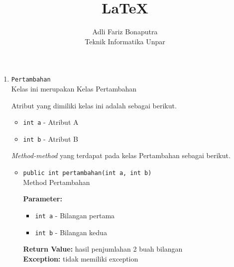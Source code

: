 \documentclass{article}
\title{\LaTeX}
\author{Adli Fariz Bonaputra \\ Teknik Informatika Unpar}
\begin{document}
\maketitle

\begin{enumerate}
	\item \texttt{Pertambahan}\\
	{Kelas ini merupakan Kelas Pertambahan}
	
	Atribut yang dimiliki kelas ini adalah sebagai berikut.
	\begin{itemize}
		\item \texttt{int a} -
		{Atribut A}
		\item \texttt{int b} -
		{Atribut B}
	\end{itemize}
	
	{\it Method-method} yang terdapat pada kelas Pertambahan sebagai berikut.
	\begin{itemize}
		\item \texttt{public int pertambahan(int a, int b)}\\
		{Method Pertambahan}
		
		\textbf{Parameter:}
		\begin{itemize}
			\item \texttt{int a} - 
			{Bilangan pertama}
			\item \texttt{int b} - 
			{Bilangan kedua}
		\end{itemize}
		
		\textbf{Return Value:} {hasil penjumlahan 2 buah bilangan}\\
		\textbf{Exception:} {tidak memiliki exception}
	\end{itemize}
\end{enumerate}
\end{document}
